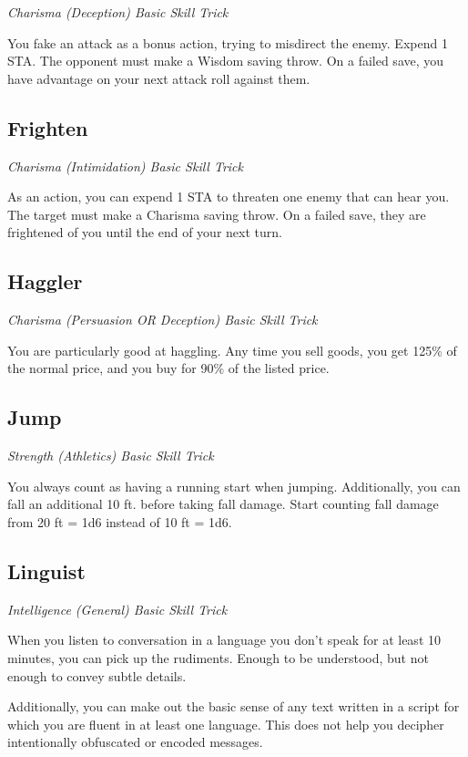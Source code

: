 \textit{Charisma (Deception) Basic Skill Trick}

You fake an attack as a bonus action, trying to misdirect the enemy. Expend 1 STA. The opponent must make a Wisdom saving throw. On a failed save, you have advantage on your next attack roll against them.

\subsection{Frighten} \label{st:frighten}

\textit{Charisma (Intimidation) Basic Skill Trick}

As an action, you can expend 1 STA to threaten one enemy that can hear you. The target must make a Charisma saving throw. On a failed save, they are frightened of you until the end of your next turn.

\subsection{Haggler}\label{st:haggler}

\textit{Charisma (Persuasion OR Deception) Basic Skill Trick}

You are particularly good at haggling. Any time you sell goods, you get 125\% of the normal price, and you buy for 90\% of the listed price.

\subsection{Jump}

\textit{Strength (Athletics) Basic Skill Trick}

You always count as having a running start when jumping. Additionally, you can fall an additional 10 ft. before taking fall damage. Start counting fall damage from 20 ft = 1d6 instead of 10 ft = 1d6.

\subsection{Linguist}\label{st:linguist}

\textit{Intelligence (General) Basic Skill Trick}

When you listen to conversation in a language you don't speak for at least 10 minutes, you can pick up the rudiments. Enough to be understood, but not enough to convey subtle details.

Additionally, you can make out the basic sense of any text written in a script for which you are fluent in at least one language. This does not help you decipher intentionally obfuscated or encoded messages.

